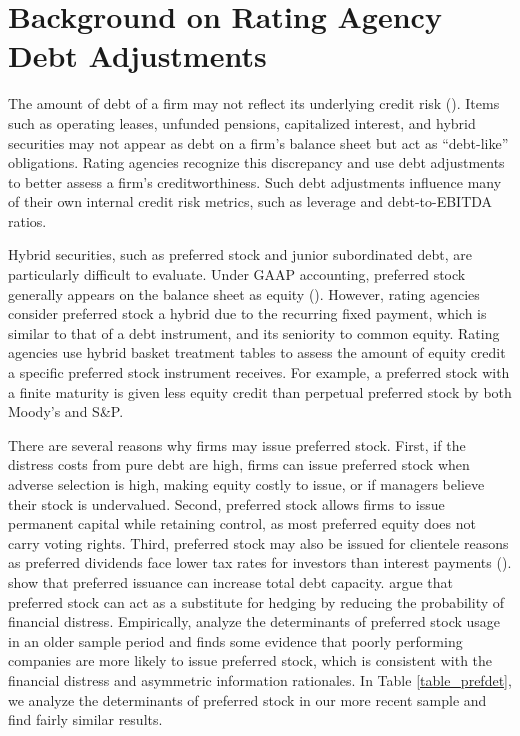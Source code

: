 \documentclass[a4paper, 12pt]{article}
\begin{document}
\section{Background on Rating Agency Debt Adjustments}

The amount of debt of a firm may not reflect its underlying credit risk (\citealp{graham2011review}). Items such as operating leases, unfunded pensions, capitalized interest, and hybrid securities may not appear as debt on a firm's balance sheet but act as ``debt-like'' obligations. Rating agencies recognize this discrepancy and use debt adjustments to better assess a firm's creditworthiness. Such debt adjustments influence many of their own internal credit risk metrics, such as leverage and debt-to-EBITDA ratios.


Hybrid securities, such as preferred stock and junior subordinated debt, are particularly difficult to evaluate. Under GAAP accounting, preferred stock generally appears on the balance sheet as equity (\citealp{pwc}). However, rating agencies consider preferred stock a hybrid due to the recurring fixed payment, which is similar to that of a debt instrument, and its seniority to common equity. Rating agencies use hybrid basket treatment tables to assess the amount of equity credit a specific preferred stock instrument receives. For example, a preferred stock with a finite maturity is given less equity credit than perpetual preferred stock by both Moody's and S\&P.


There are several reasons why firms may issue preferred stock. First, if the distress costs from pure debt are high, firms can issue preferred stock when adverse selection is high, making equity costly to issue, or if managers believe their stock is undervalued. Second, preferred stock allows firms to issue permanent capital while retaining control, as most preferred equity does not carry voting rights. Third, preferred stock may also be issued for clientele reasons as preferred dividends face lower tax rates for investors than interest payments (\citealp{RAVID2007198}). \cite{heinkel1990role} show that preferred issuance can increase total debt capacity. \cite{nance1993determinants} argue that preferred stock can act as a substitute for hedging by reducing the probability of financial distress. Empirically, \cite{RAVID2007198} analyze the determinants of preferred stock usage in an older sample period and finds some evidence that poorly performing companies are more likely to issue preferred stock, which is consistent with the financial distress and asymmetric information rationales. In Table \ref{table_prefdet}, we analyze the determinants of preferred stock in our more recent sample and find fairly similar results.
\end{document}
